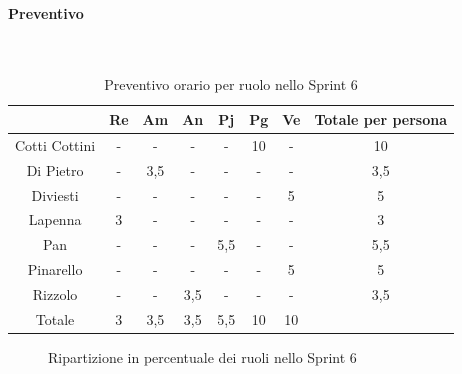 \documentclass{article}
\begin{document}
                \paragraph{Preventivo}\mbox{}\\
                \begin{table}[H]
                    \centering
                    \begin{tabular}{|c|c|c|c|c|c|c|c|}
                    \hline
                                  & Re  & Am  & An  & Pj  & Pg  & Ve  & Totale per persona \\ \hline
                    Cotti Cottini & -   & -   & -   & -   & 10  & -   & 10                 \\ \hline
                    Di Pietro     & -   & 3,5 & -   & -   & -   & -   & 3,5                \\ \hline
                    Diviesti      & -   & -   & -   & -   & -   & 5   & 5                  \\ \hline
                    Lapenna       & 3   & -   & -   & -   & -   & -   & 3                  \\ \hline
                    Pan           & -   & -   & -   & 5,5 & -   & -   & 5,5                \\ \hline
                    Pinarello     & -   & -   & -   & -   & -   & 5   & 5                  \\ \hline
                    Rizzolo       & -   & -   & 3,5 & -   & -   & -   & 3,5                \\ \hline
                    Totale        & 3   & 3,5 & 3,5 & 5,5 & 10  & 10  &                    \\ \hline
                    \end{tabular}
                    \caption{Preventivo orario per ruolo nello Sprint 6}
                \end{table}


                \begin{figure}[H]
                    \centering
                    \caption{Ripartizione in percentuale dei ruoli nello Sprint 6}
                \end{figure}
\end{document}
